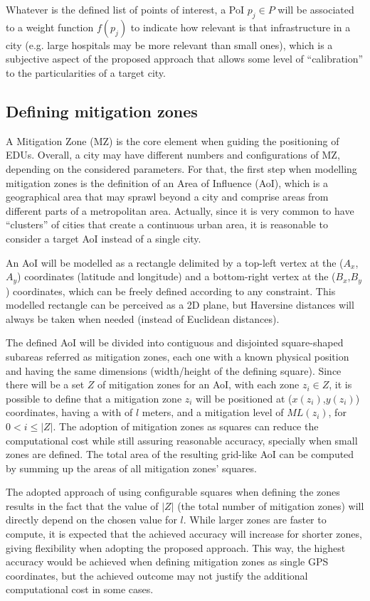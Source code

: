 \begin{refsection}
Whatever is the defined list of points of interest, a PoI $p_j \in P$ will be associated to a weight function $f(p_j)$ to indicate how relevant is that infrastructure in a city (e.g. large hospitals may be more relevant than small ones), which is a subjective aspect of the proposed approach that allows some level of ``calibration'' to the particularities of a target city.

%
\subsection {Defining mitigation zones}

A Mitigation Zone (MZ) is the core element when guiding the positioning of EDUs. Overall, a city may have different numbers and configurations of MZ, depending on the considered parameters. For that, the first step when modelling mitigation zones is the definition of an Area of Influence (AoI), which is a geographical area that may sprawl beyond a city and comprise areas from different parts of a metropolitan area. Actually, since it is very common to have ``clusters'' of cities that create a continuous urban area, it is reasonable to consider a target AoI instead of a single city. 

An AoI will be modelled as a rectangle delimited by a top-left vertex at the ($A_x$,$A_y$) coordinates (latitude and longitude) and a bottom-right vertex at the ($B_x$,$B_y$) coordinates, which can be freely defined according to any constraint. This modelled rectangle can be perceived as a 2D plane, but Haversine distances will always be taken when needed (instead of Euclidean distances). 

The defined AoI will be divided into contiguous and disjointed square-shaped subareas referred as mitigation zones, each one with a known physical position and having the same dimensions (width/height of the defining square). Since there will be a set $Z$ of mitigation zones for an AoI, with each zone $z_i \in Z$, it is possible to define that a mitigation zone $z_i$ will be positioned at ($x(z_i)$,$y(z_i)$) coordinates, having a with of $l$ meters, and a mitigation level of $ML(z_i)$, for $0 < i \le |Z|$. The adoption of mitigation zones as squares can reduce the computational cost while still assuring reasonable accuracy, specially when small zones are defined. The total area of the resulting grid-like AoI can be computed by summing up the areas of all mitigation zones' squares.

The adopted approach of using configurable squares when defining the zones results in the fact that the value of $|Z|$ (the total number of mitigation zones) will directly depend on the chosen value for $l$. While larger zones are faster to compute, it is expected that the achieved accuracy will increase for shorter zones, giving flexibility when adopting the proposed approach. This way, the highest accuracy would be achieved when defining mitigation zones as single GPS coordinates, but the achieved outcome may not justify the additional computational cost in some cases. 


\end{refsection}
